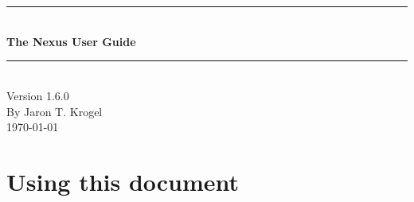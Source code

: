 \documentclass[oneside,11pt]{memoir}
\numberwithin{equation}{section}
\newcommand{\HRule}{\rule{\linewidth}{0.5mm}}
\newenvironment{changemargin}[2]{%
\begin{list}{}{%
\setlength{\leftmargin}{#1}%
\setlength{\rightmargin}{#2}%
}%
\item[]}{\end{list}}
\begin{document}


\thispagestyle{empty}
\begin{changemargin}{-1cm}{-1cm}
  \begin{center}
    \hspace{1cm}\\
    \hspace{1cm}\\
    \hspace{1cm}\\
    \hspace{1cm}\\
    \hspace{1cm}\\
    \hspace{1cm}\\
    \hspace{1cm}\\
    \hspace{1cm}\\
    \hspace{1cm}\\
    \hspace{1cm}\\
    \hspace{1cm}\\
    \hspace{1cm}\\
    \HRule\\
    \vspace{4mm}
    \textbf{\fontsize{40}{45}\selectfont The Nexus User Guide} \\ 
    \HRule\\
    \vspace{1cm}
    \vspace{6cm}
    Version 1.6.0 \\
    \vspace{1 cm}
    By Jaron T. Krogel \\
    \vspace{1cm}
    \today
  \end{center}
\end{changemargin}
\pagebreak

\tableofcontents



\mainmatter

\pagebreak
\chapter{Using this document} \label{usedoc}
\end{document}
